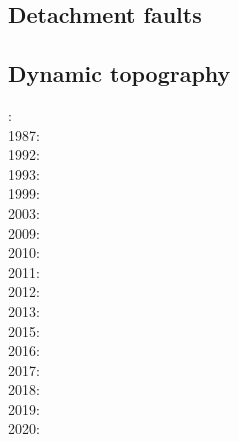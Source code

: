 \subsection{Detachment faults} 

{\scriptsize
\noindent
\cite{werr07}
\cite{jaml10}
\cite{rera11}
\cite{matv15}
\cite{gubg19}
}

\subsection{Dynamic topography} 

{\scriptsize
{}: \cite{hacr85}\\
1987: \cite{repa87}\\
1992: \cite{kiha92}\\
1993: \cite{gurn93}\cite{gurn93b}\\
1999: \cite{bumo99}\\
2003: \cite{cogu03}\\
2009: \cite{cohu09}\\
2010: \cite{bofb10}\cite{brau10}\cite{stfh10}\cite{shml10}\\
2011: \cite{rapy11}\\
2012: \cite{shlm12}\cite{zhzf12}\\
2013: \cite{brrs13}\cite{flgm13}\\
2015: \cite{aupm15}\cite{kiff15}\cite{dali15}\\
2016: \cite{howa16}\cite{gvfb16}\cite{yagu16}\cite{stei16}\cite{cogb16}\\
2017: \cite{yamm17}\cite{aumh17}\cite{grrb17}\\
2018: \cite{osss18}\cite{vibc18}\\
2019: \cite{deli19}\cite{davk19}\cite{bore19}\\
2020: \cite{braf20}
}

